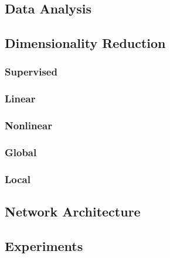 \documentclass[conference]{IEEEtran}
\begin{document}
	\subsection{Data Analysis}
	
	\subsection{Dimensionality Reduction}
	
	\subsubsection*{Supervised}
	\subsubsection*{Linear}
	\subsubsection*{Nonlinear}
	\subsubsection*{Global}
	\subsubsection*{Local}
	
	\subsection{Network Architecture}
	
	
	
	





	


\subsection{Experiments} \label{Experiments}
\end{document}
